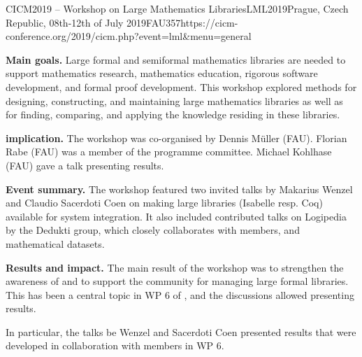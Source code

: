 \begin{event}{CICM2019 -- Workshop on Large Mathematics Libraries}{LML2019}{Prague, Czech Republic, 08th-12th of July 2019}{FAU}{35}{7}{https://cicm-conference.org/2019/cicm.php?event=lml&menu=general}

\textbf{Main goals.}
Large formal and semiformal mathematics libraries are needed to support mathematics research, mathematics education, rigorous software development, and formal proof development.
This workshop explored methods for designing, constructing, and maintaining large mathematics libraries as well as for finding, comparing, and applying the knowledge residing in these libraries. 

\textbf{\ODK implication.}
The workshop was co-organised by Dennis M\"uller (FAU).
Florian Rabe (FAU) was a member of the programme committee.
Michael Kohlhase (FAU) gave a talk presenting \ODK results.

\textbf{Event summary.}
The workshop featured two invited talks by Makarius Wenzel and Claudio Sacerdoti Coen on making large libraries (Isabelle resp. Coq) available for system integration.
It also included contributed talks on Logipedia by the Dedukti group, which closely collaborates with \ODK members, and mathematical datasets.

\textbf{Results and impact.}
The main result of the workshop was to strengthen the awareness of and to support the community for managing large formal libraries.
This has been a central topic in WP 6 of \ODK, and the discussions allowed presenting \ODK results.

In particular, the talks be Wenzel and Sacerdoti Coen presented results that were developed in collaboration with \ODK members in WP 6.
\end{event}

